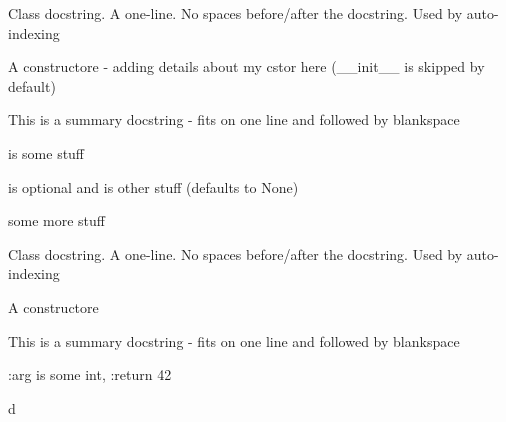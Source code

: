 \documentclass[letterpaper,10pt,english]{sphinxmanual}
\begin{document}
\begin{fulllineitems}
\label{\detokenize{index:deep_thought.main.SomeClass}}
Class docstring. A one-line. No spaces before/after the docstring. Used by auto-indexing

A constructore - adding details about my cstor here (\_\_init\_\_ is skipped by default)

\begin{fulllineitems}
\label{\detokenize{index:deep_thought.main.SomeClass.some_complicated_method}}
This is a summary docstring - fits on one line and followed by blankspace

 is some stuff

 is optional and is other stuff (defaults to None)

 some more stuff

\end{fulllineitems}


\end{fulllineitems}


\begin{fulllineitems}
\label{\detokenize{index:deep_thought.main.Subclass}}
Class docstring. A one-line. No spaces before/after the docstring. Used by auto-indexing

A constructore

\begin{fulllineitems}
\label{\detokenize{index:deep_thought.main.Subclass.another_method}}
This is a summary docstring - fits on one line and followed by blankspace

:arg  is some int,
:return 42

\end{fulllineitems}


\end{fulllineitems}



\renewcommand{\indexname}{Python Module Index}
\begin{sphinxtheindex}
\def\bigletter#1{{\Large\sffamily#1}\nopagebreak\vspace{1mm}}
\bigletter{d}
\item {}
\item {}
\end{sphinxtheindex}

\renewcommand{\indexname}{Index}
\printindex
\end{document}
